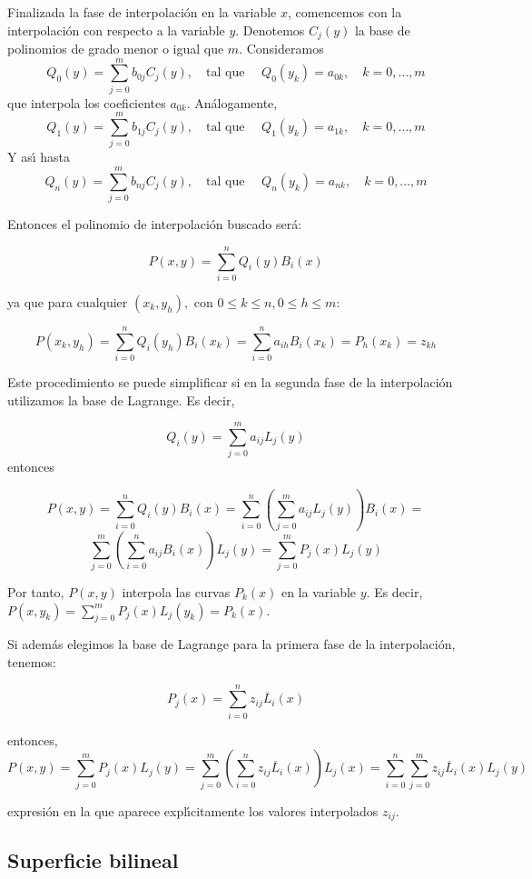 \documentclass[ebook,oneside]{memoir}
\begin{document}
Finalizada la fase de interpolaci\'{o}n en la variable $x$, comencemos con la interpolaci\'{o}n con respecto a la variable $y$. Denotemos $C_j(y)$ la base de polinomios de grado menor o igual que $m$. Consideramos
$$Q_0(y)=\sum_{j=0}^m b_{0j}C_j(y),\quad  \mbox{tal que }\quad Q_0(y_k)=a_{0k},\quad k=0,\ldots,m$$
que interpola los coeficientes $a_{0k}$. An\'{a}logamente,
$$Q_1(y)=\sum_{j=0}^m b_{1j}C_j(y),\quad \mbox{tal que }\quad Q_1(y_k)=a_{1k},\quad k=0,\ldots,m$$
Y as\'{\i} hasta
$$Q_n(y)=\sum_{j=0}^m b_{nj}C_j(y),\quad \mbox{tal que }\quad
    Q_n(y_k)=a_{nk},\quad k=0,\ldots,m$$

Entonces el polinomio de interpolaci\'{o}n buscado ser\'{a}:

$$P(x,y)=\sum_{i=0}^n Q_i(y) B_i(x)$$

ya que para cualquier $(x_k,y_h),$ con $0\leq k\leq n, 0\leq h\leq m$:

$$P(x_k,y_h)=\sum_{i=0}^n Q_i(y_h)B_i(x_k)=\sum_{i=0}^n a_{ih} B_i(x_k)=P_h(x_k)=z_{kh}$$

%

Este procedimiento se puede simplificar si en la segunda fase de la interpolaci\'{o}n utilizamos la base de Lagrange. Es decir,

$$Q_i(y)=\sum_{j=0}^m a_{ij} L_j(y)$$
entonces

$$P(x,y)=\sum_{i=0}^n Q_i(y) B_i(x)=\sum_{i=0}^n \left( \sum_{j=0}^m a_{ij} L_j(y)\right) B_i(x)=$$ $$\sum_{j=0}^m \left( \sum_{i=0}^n a_{ij} B_i(x)\right) L_j(y)= \sum_{j=0}^m P_j(x)L_j(y)$$

Por tanto, $P(x,y)$ interpola las curvas $P_k(x)$ en la variable $y$. Es decir, $P(x,y_k)=\sum_{j=0}^m P_j(x)L_j(y_k)= P_k(x)$.

Si adem\'{a}s elegimos la base de Lagrange para la primera fase de la interpolaci\'{o}n, tenemos:

$$P_j(x)=\sum_{i=0}^n z_{ij} \overline{L}_i(x)$$

entonces,
$$P(x,y)=\sum_{j=0}^m P_j(x) L_j(y)=\sum_{j=0}^m \left( \sum_{i=0}^n z_{ij} \overline{L}_i(x)\right) L_j(x)=\sum_{i=0}^n \sum_{j=0}^m z_{ij} \overline{L}_i(x) L_j(y)$$

expresi\'{o}n en la que aparece expl\'{\i}citamente los valores interpolados $z_{ij}$.

\subsection{Superficie bilineal}
\end{document}
